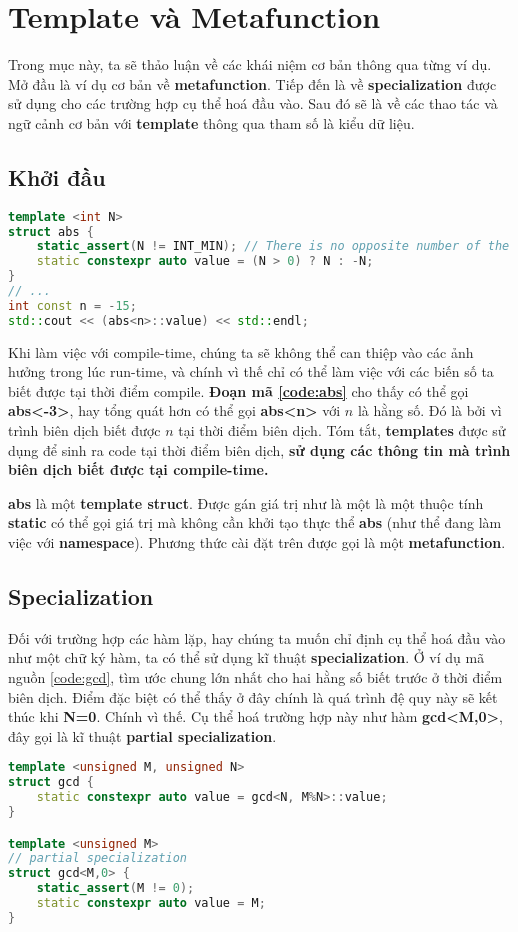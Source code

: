 \section{Template và Metafunction}
\label{sec:template}
Trong mục này, ta sẽ thảo luận về các khái niệm cơ bản thông qua từng ví dụ. Mở đầu là ví dụ cơ bản về \textbf{metafunction}. Tiếp đến là về \textbf{specialization} được sử dụng cho các trường hợp cụ thể hoá đầu vào. Sau đó sẽ là về các thao tác và ngữ cảnh cơ bản với \textbf{template} thông qua tham số là kiểu dữ liệu.
\subsection{Khởi đầu}
\begin{lstlisting}[caption={Ví dụ cho hàm trị tuyệt đối \cite{Walter}},label={code:abs},language=C++]
template <int N>
struct abs {
    static_assert(N != INT_MIN); // There is no opposite number of the smallest int
    static constexpr auto value = (N > 0) ? N : -N;
}
// ...
int const n = -15;
std::cout << (abs<n>::value) << std::endl;
\end{lstlisting}

Khi làm việc với compile-time, chúng ta sẽ không thể can thiệp vào các ảnh hưởng trong lúc run-time, và chính vì thế chỉ có thể làm việc với các biến số ta biết được tại thời điểm compile. \textbf{Đoạn mã \ref{code:abs}} cho thấy có thể gọi \textbf{abs<-3>}, hay tổng quát hơn có thể gọi \textbf{abs<n>} với $n$ là hằng số. Đó là bởi vì trình biên dịch biết được $n$ tại thời điểm biên dịch. Tóm tắt, \textbf{templates} được sử dụng để sinh ra code tại thời điểm biên dịch, \textbf{sử dụng các thông tin mà trình biên dịch biết được tại compile-time.}

\textbf{abs} là một \textbf{template struct}. Được gán giá trị như là một là một thuộc tính \textbf{static} có thể gọi giá trị mà không cần khởi tạo thực thể \textbf{abs} (như thể đang làm việc với \textbf{namespace}). Phương thức cài đặt trên được gọi là một \textbf{metafunction}.
\subsection{Specialization}
\label{sec:specialization}
Đối với trường hợp các hàm lặp, hay chúng ta muốn chỉ định cụ thể hoá đầu vào như một chữ ký hàm, ta có thể sử dụng kĩ thuật \textbf{specialization}. Ở ví dụ mã nguồn \ref{code:gcd}, tìm ước chung lớn nhất cho hai hằng số biết trước ở thời điểm biên dịch. Điểm đặc biệt có thể thấy ở đây chính là quá trình đệ quy này sẽ kết thúc khi \textbf{N=0}. Chính vì thế. Cụ thể hoá trường hợp này như hàm \textbf{gcd<M,0>}, đây gọi là kĩ thuật \textbf{partial specialization}.
\begin{lstlisting}[caption={Ví dụ cho hàm đệ quy \cite{Walter}},label={code:gcd},language=C++]
template <unsigned M, unsigned N> 
struct gcd {
    static constexpr auto value = gcd<N, M%N>::value;
}

template <unsigned M>
// partial specialization
struct gcd<M,0> { 
    static_assert(M != 0);
    static constexpr auto value = M;
}
\end{lstlisting}

